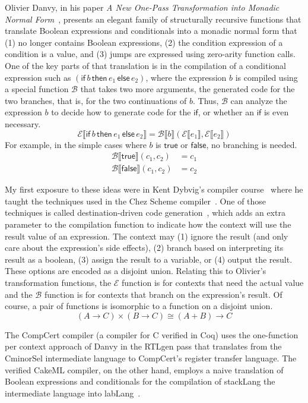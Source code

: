 \documentclass[sigplan,review,dvipsnames,screen,10pt]{acmart}
\newcommand{\TRUE}[0]{\mathsf{true}}
\newcommand{\FALSE}[0]{\mathsf{false}}
\newcommand{\IF}[3]{\mathsf{if}\,#1\,\mathsf{then}\,#2\,\mathsf{else}\,#3}
\newcommand{\CE}[1]{\mathcal{E} \llbracket #1 \rrbracket}
\newcommand{\CB}[3]{\mathcal{B} \llbracket #1 \rrbracket ( #2, #3 )}
\begin{document}
Olivier Danvy, in his paper \emph{A New One-Pass Transformation into
Monadic Normal Form}~\citep{Danvy:2003fk}, presents an elegant family
of structurally recursive functions that translate Boolean expressions
and conditionals into a monadic normal form that (1) no longer
contains Boolean expressions, (2) the condition expression of a
condition is a value, and (3) jumps are expressed using zero-arity
function calls. One of the key parts of that translation is in the
compilation of a conditional expression such as $(\IF{b}{e_1}{e_2})$,
where the expression $b$ is compiled using a special function
$\mathcal{B}$ that takes two more arguments, the generated code for
the two branches, that is, for the two continuations of $b$. Thus,
$\mathcal{B}$ can analyze the expression $b$ to decide how to generate
code for the $\mathsf{if}$, or whether an $\mathsf{if}$ is even
necessary.
\[
\CE{\IF{b}{e_1}{e_2}} = \CB{b}{\CE{e_1}}{\CE{e_2}}
\]
For example, in the simple cases where $b$ is $\TRUE$ or $\FALSE$,
no branching is needed.
\begin{align*}
\CB{\TRUE}{c_1}{c_2} &= c_1 \\
\CB{\FALSE}{c_1}{c_2} &= c_2
\end{align*}

My first exposure to these ideas were in Kent Dybvig's compiler
course~\citep{Dybvig:2010aa} where he taught the techniques used in
the Chez Scheme compiler~\citep{Dybvig:2006aa}.  One of those
techniques is called destination-driven code
generation~\citep{Dybvig:1990aa}, which adds an extra parameter to the
compilation function to indicate how the context will use the result
value of an expression. The context may (1) ignore the result (and
only care about the expression's side effects), (2) branch based on
interpreting its result as a boolean, (3) assign the result to a
variable, or (4) output the result. These options are encoded as a
disjoint union.  Relating this to Olivier's transformation functions,
the $\mathcal{E}$ function is for contexts that need the actual value
and the $\mathcal{B}$ function is for contexts that branch on the
expression's result. Of course, a pair of functions is isomorphic to a
function on a disjoint union.
\[
(A → C) × (B → C) ≅ (A + B) → C
\]

The CompCert compiler \citep{Leroy:2006fe} (a compiler for C verified
in Coq) uses the one-function per context approach of Danvy in the
RTLgen pass that translates from the CminorSel intermediate language
to CompCert's register transfer language. The verified CakeML
compiler, on the other hand, employs a naive translation of Boolean
expressions and conditionals for the compilation of stackLang the
intermediate language into labLang~\citep{Kumar:2014aa}.
\end{document}
